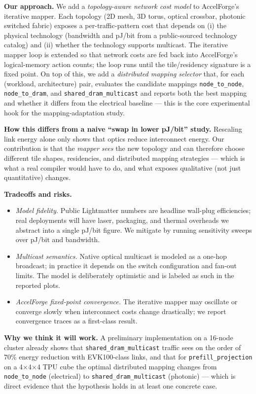 \documentclass[conference,onecolumn]{IEEEtran}
\begin{document}
\textbf{Our approach.}
We add a \emph{topology-aware network cost model} to AccelForge's iterative
mapper. Each topology (2D mesh, 3D torus, optical crossbar, photonic switched
fabric) exposes a per-traffic-pattern cost that depends on (i) the physical
technology (bandwidth and pJ/bit from a public-sourced technology catalog) and
(ii) whether the technology supports multicast. The iterative mapper loop is
extended so that network costs are fed back into AccelForge's logical-memory
action counts; the loop runs until the tile/residency signature is a fixed
point. On top of this, we add a \emph{distributed mapping selector} that, for
each (workload, architecture) pair, evaluates the candidate mappings
\texttt{node\_to\_node}, \texttt{node\_to\_dram}, and
\texttt{shared\_dram\_multicast} and reports both the best mapping and whether
it differs from the electrical baseline --- this is the core experimental
hook for the mapping-adaptation study.

\textbf{How this differs from a naive ``swap in lower pJ/bit'' study.}
Rescaling link energy alone only shows that optics reduce interconnect energy.
Our contribution is that the \emph{mapper sees} the new topology and can
therefore choose different tile shapes, residencies, and distributed mapping
strategies --- which is what a real compiler would have to do, and what
exposes qualitative (not just quantitative) changes.

\textbf{Tradeoffs and risks.}
\begin{itemize}
    \item \emph{Model fidelity.} Public Lightmatter numbers are headline
    wall-plug efficiencies; real deployments will have laser, packaging, and
    thermal overheads we abstract into a single pJ/bit figure. We mitigate by
    running sensitivity sweeps over pJ/bit and bandwidth.
    \item \emph{Multicast semantics.} Native optical multicast is modeled as a
    one-hop broadcast; in practice it depends on the switch configuration and
    fan-out limits. The model is deliberately optimistic and is labeled as
    such in the reported plots.
    \item \emph{AccelForge fixed-point convergence.} The iterative mapper may
    oscillate or converge slowly when interconnect costs change drastically;
    we report convergence traces as a first-class result.
\end{itemize}

\textbf{Why we think it will work.}
A preliminary implementation on a 16-node cluster already shows that
\texttt{shared\_dram\_multicast} traffic sees on the order of 70\% energy
reduction with EVK100-class links, and that for \texttt{prefill\_projection} on
a 4$\times$4$\times$4 TPU cube the optimal distributed mapping changes from
\texttt{node\_to\_node} (electrical) to \texttt{shared\_dram\_multicast}
(photonic) --- which is direct evidence that the hypothesis holds in at least
one concrete case.
\end{document}
